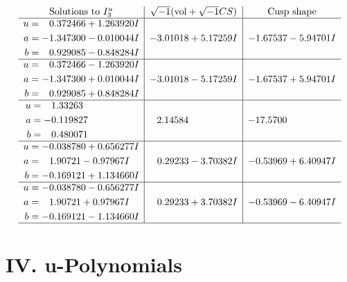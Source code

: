 \documentclass[1p]{elsarticle_modified}
\theoremstyle{definition}
\newcommand{\I}{\sqrt{-1}}
\begin{document}
$$\begin{array}{c|c|c}  
\text{Solutions to }I^u_{3}& \I (\text{vol} + \sqrt{-1}CS) & \text{Cusp shape}\\
 \hline 
\begin{aligned}
u &= \phantom{-}0.372466 + 1.263920 I \\
a &= -1.347300 - 0.010044 I \\
b &= \phantom{-}0.929085 - 0.848284 I\end{aligned}
 & -3.01018 + 5.17259 I & -1.67537 - 5.94701 I \\ \hline\begin{aligned}
u &= \phantom{-}0.372466 - 1.263920 I \\
a &= -1.347300 + 0.010044 I \\
b &= \phantom{-}0.929085 + 0.848284 I\end{aligned}
 & -3.01018 - 5.17259 I & -1.67537 + 5.94701 I \\ \hline\begin{aligned}
u &= \phantom{-}1.33263\phantom{ +0.000000I} \\
a &= -0.119827\phantom{ +0.000000I} \\
b &= \phantom{-}0.480071\phantom{ +0.000000I}\end{aligned}
 & \phantom{-}2.14584\phantom{ +0.000000I} & -17.5700\phantom{ +0.000000I} \\ \hline\begin{aligned}
u &= -0.038780 + 0.656277 I \\
a &= \phantom{-}1.90721 - 0.97967 I \\
b &= -0.169121 + 1.134660 I\end{aligned}
 & \phantom{-}0.29233 - 3.70382 I & -0.53969 + 6.40947 I \\ \hline\begin{aligned}
u &= -0.038780 - 0.656277 I \\
a &= \phantom{-}1.90721 + 0.97967 I \\
b &= -0.169121 - 1.134660 I\end{aligned}
 & \phantom{-}0.29233 + 3.70382 I & -0.53969 - 6.40947 I\\
 \hline 
 \end{array}$$\newpage
\newpage\renewcommand{\arraystretch}{1}
\centering \section*{ IV. u-Polynomials}
\end{document}
